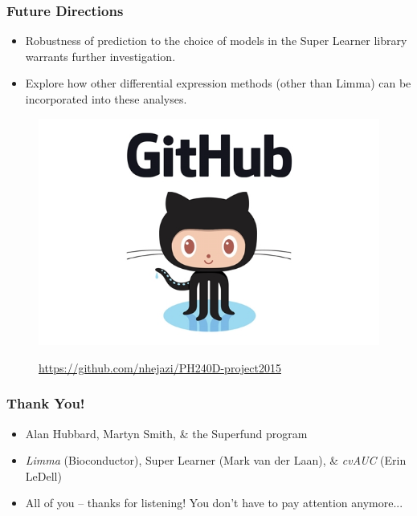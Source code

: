 \documentclass{beamer}
\begin{document}
\begin{frame}[fragile]
  	\frametitle{Future Directions}
		\begin{itemize}
			\item Robustness of prediction to the choice of models in the Super Learner library warrants further investigation. 
			\item Explore how other differential expression methods (other than Limma) can be incorporated into these analyses.
		\end{itemize}
  		\begin{figure}
   			\href{https://github.com/nhejazi/PH240D-project2015}
         			{\includegraphics[scale=0.25]{../paper/figs/octocat.png}}
			\caption{\url{https://github.com/nhejazi/PH240D-project2015}}
      		\end{figure}
\end{frame}

\begin{frame}[fragile]
  	\frametitle{Thank You!}
		\begin{itemize}
			\item {Alan Hubbard, Martyn Smith, \& the Superfund program} \\
			\item {\textit{Limma} (Bioconductor), Super Learner (Mark van der Laan), \& \textit{cvAUC} (Erin LeDell)} \\
			\item {All of you -- thanks for listening! You don't have to pay attention anymore...}
		\end{itemize}
\end{frame}
\end{document}
